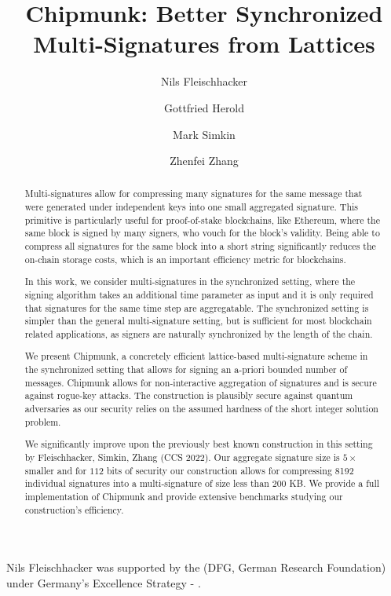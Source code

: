 \documentclass[sigconf]{acmart}
\title{Chipmunk: Better Synchronized Multi-Signatures from Lattices}
\author{Nils Fleischhacker}
\affiliation{
  \institution{Ruhr University Bochum}
  \city{Bochum}
  \country{Germany}
}
\author{Gottfried Herold}
\affiliation{
  \institution{Ethereum Foundation}
  \city{Bonn}
  \country{Germany}
}
\author{Mark Simkin}
\affiliation{
  \institution{Ethereum Foundation}
  \city{Aarhus}
  \country{Denmark}
}
\author{Zhenfei Zhang}
\affiliation{
  \institution{Ethereum Foundation}
  \city{Boston}
  \country{USA}
}
\theoremstyle{acmdefinition}
\theoremstyle{acmplain}
\begin{document}
\begin{abstract}
Multi-signatures allow for compressing many signatures for the same message that were generated under independent keys into one small aggregated signature. 
This primitive is particularly useful for proof-of-stake blockchains, like Ethereum, where the same block is signed by many signers, who vouch for the block's validity.
Being able to compress all signatures for the same block into a short string significantly reduces the on-chain storage costs, which is an important efficiency metric for blockchains.

In this work, we consider multi-signatures in the synchronized setting, where the signing algorithm takes an additional time parameter as input and it is only required that signatures for the same time step are aggregatable.
The synchronized setting is simpler than the general multi-signature setting, but is sufficient for most blockchain related applications, as signers are naturally synchronized by the length of the chain.

We present Chipmunk, a concretely efficient lattice-based multi-signature scheme in the synchronized setting that allows for signing an a-priori bounded number of messages.
Chipmunk allows for non-interactive aggregation of signatures and is secure against rogue-key attacks.
The construction is plausibly secure against quantum adversaries as our security relies on the assumed hardness of the short integer solution problem.

We significantly improve upon the previously best known construction in this setting by Fleischhacker, Simkin, Zhang (CCS 2022).
Our aggregate signature size is $5 \times$ smaller and for $112$ bits of security our construction allows for compressing 8192 individual signatures into a multi-signature of size less than $200$ KB.
We provide a full implementation of Chipmunk and provide extensive benchmarks studying our construction's efficiency.

\end{abstract}
\maketitle








\begin{acks}
   Nils Fleischhacker was supported by the  (DFG, German Research Foundation) under Germany's Excellence Strategy - .
\end{acks}
\end{document}
